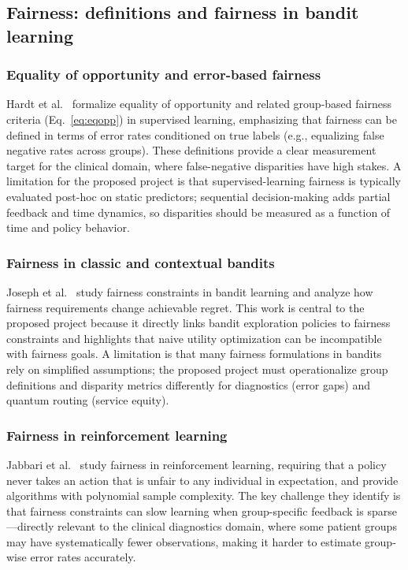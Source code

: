 \documentclass[conference]{IEEEtran}
\begin{document}
\subsection{Fairness: definitions and fairness in bandit learning}

\subsubsection{Equality of opportunity and error-based fairness}
Hardt et al.~\cite{hardt2016equality} formalize equality of opportunity and related
group-based fairness criteria (Eq.~\ref{eq:eqopp}) in supervised learning, emphasizing that
fairness can be defined in terms of error rates conditioned on true labels (e.g., equalizing
false negative rates across groups). These definitions provide a clear measurement target for
the clinical domain, where false-negative disparities have high stakes. A limitation for the
proposed project is that supervised-learning fairness is typically evaluated post-hoc on
static predictors; sequential decision-making adds partial feedback and time dynamics, so
disparities should be measured as a function of time and policy behavior.

\subsubsection{Fairness in classic and contextual bandits}
Joseph et al.~\cite{joseph2016fairness} study fairness constraints in bandit learning and
analyze how fairness requirements change achievable regret. This work is central to the
proposed project because it directly links bandit exploration policies to fairness constraints
and highlights that naive utility optimization can be incompatible with fairness goals.
A limitation is that many fairness formulations in bandits rely on simplified assumptions;
the proposed project must operationalize group definitions and disparity metrics differently
for diagnostics (error gaps) and quantum routing (service equity).

\subsubsection{Fairness in reinforcement learning}
Jabbari et al.~\cite{jabbari2017fairness} study fairness in reinforcement learning, requiring
that a policy never takes an action that is unfair to any individual in expectation, and
provide algorithms with polynomial sample complexity. The key challenge they identify is that
fairness constraints can slow learning when group-specific feedback is sparse---directly
relevant to the clinical diagnostics domain, where some patient groups may have systematically
fewer observations, making it harder to estimate group-wise error rates accurately.
\end{document}
